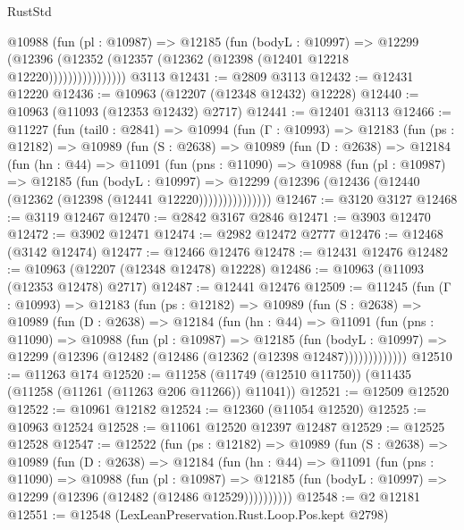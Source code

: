 \begin{lexlean}{RustStd}
\begin{coremodule}
{\begin{coremodule}
{{{{{{{{{{{{{{{{{{{{{{{{{{{{{{{{{                  @10988
                    (fun (pl : @10987) =>
                    @12185
                      (fun (bodyL : @10997) =>
                      @12299
                        (@12396
                          (@12352 (@12357 (@12362 (@12398 (@12401 @12218 @12220))))))))))))))))
    @3113
@12431 := @2809 @3113
@12432 := @12431 @12220
@12436 := @10963 (@12207 (@12348 @12432) @12228)
@12440 := @10963 (@11093 (@12353 @12432) @2717)
@12441 := @12401 @3113
@12466 := @11227
    (fun (tail0 : @2841) =>
    @10994
      (fun (Γ : @10993) =>
      @12183
        (fun (ps : @12182) =>
        @10989
          (fun (S : @2638) =>
          @10989
            (fun (D : @2638) =>
            @12184
              (fun (hn : @44) =>
              @11091
                (fun (pns : @11090) =>
                @10988
                  (fun (pl : @10987) =>
                  @12185
                    (fun (bodyL : @10997) =>
                    @12299 (@12396 (@12436 (@12440 (@12362 (@12398 (@12441 @12220)))))))))))))))
@12467 := @3120 @3127
@12468 := @3119 @12467
@12470 := @2842 @3167 @2846
@12471 := @3903 @12470
@12472 := @3902 @12471
@12474 := @2982 @12472 @2777
@12476 := @12468 (@3142 @12474)
@12477 := @12466 @12476
@12478 := @12431 @12476
@12482 := @10963 (@12207 (@12348 @12478) @12228)
@12486 := @10963 (@11093 (@12353 @12478) @2717)
@12487 := @12441 @12476
@12509 := @11245
    (fun (Γ : @10993) =>
    @12183
      (fun (ps : @12182) =>
      @10989
        (fun (S : @2638) =>
        @10989
          (fun (D : @2638) =>
          @12184
            (fun (hn : @44) =>
            @11091
              (fun (pns : @11090) =>
              @10988
                (fun (pl : @10987) =>
                @12185
                  (fun (bodyL : @10997) =>
                  @12299 (@12396 (@12482 (@12486 (@12362 (@12398 @12487)))))))))))))
@12510 := @11263 @174
@12520 := @11258 (@11749 (@12510 @11750)) (@11435 (@11258 (@11261 (@11263 @206 @11266)) @11041))
@12521 := @12509 @12520
@12522 := @10961 @12182
@12524 := @12360 (@11054 @12520)
@12525 := @10963 @12524
@12528 := @11061 @12520 @12397 @12487
@12529 := @12525 @12528
@12547 := @12522
    (fun (ps : @12182) =>
    @10989
      (fun (S : @2638) =>
      @10989
        (fun (D : @2638) =>
        @12184
          (fun (hn : @44) =>
          @11091
            (fun (pns : @11090) =>
            @10988
              (fun (pl : @10987) =>
              @12185 (fun (bodyL : @10997) => @12299 (@12396 (@12482 (@12486 @12529))))))))))
@12548 := @2 @12181
@12551 := @12548 (LexLeanPreservation.Rust.Loop.Pos.kept @2798)
}}}}}}}}}}}}}}}}}}}}}}}}}}}}}}}}}
\end{coremodule}}
\end{coremodule}
\end{lexlean}
